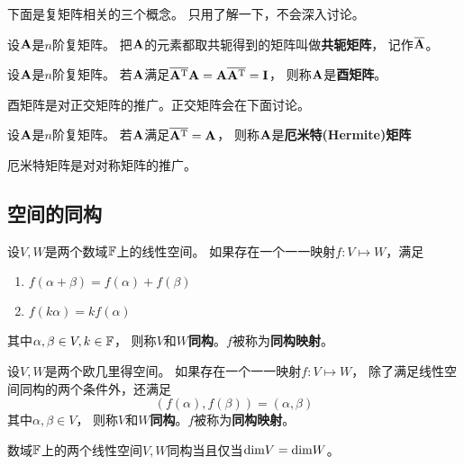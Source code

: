 下面是复矩阵相关的三个概念。
只用了解一下，不会深入讨论。

\begin{definition}[共轭矩阵]
  设$\mathbf{A}$是$n$阶复矩阵。
  把$\mathbf{A}$的元素都取共轭得到的矩阵叫做\textbf{共轭矩阵}，
  记作$\overline{\mathbf{A}}$。
\end{definition}

\begin{definition}[酉矩阵]
  设$\mathbf{A}$是$n$阶复矩阵。
  若$\mathbf{A}$满足$\overline{\mathbf{A}^{\textrm{T}}}\mathbf{A}=\mathbf{A}\overline{\mathbf{A}^{\textrm{T}}}=\mathbf{I}$，
  则称$\mathbf{A}$是\textbf{酉矩阵}。
\end{definition}

\begin{remark}
  酉矩阵是对正交矩阵的推广。正交矩阵会在下面讨论。
\end{remark}

\begin{definition}
  设$\mathbf{A}$是$n$阶复矩阵。
  若$\mathbf{A}$满足$\overline{\mathbf{A}^{\textrm{T}}}=\mathbf{A}$，
  则称$\mathbf{A}$是\textbf{厄米特(Hermite)矩阵}
\end{definition}

\begin{remark}
  厄米特矩阵是对对称矩阵的推广。
\end{remark}

\subsection{空间的同构}
\begin{definition}[线性空间的同构]
  设$V,W$是两个数域$\mathbb{F}$上的线性空间。
  如果存在一个一一映射$f:V\mapsto W$，满足
  \begin{enumerate}
    \item
    $f(\alpha+\beta)=f(\alpha)+f(\beta)$
    \item
    $f(k\alpha)=kf(\alpha)$
  \end{enumerate}
  其中$\alpha,\beta\in V,k\in\mathbb{F}$，
  则称$V$和$W$\textbf{同构}。$f$被称为\textbf{同构映射}。
\end{definition}

\begin{definition}[欧几里得空间的同构]
  设$V,W$是两个欧几里得空间。
  如果存在一个一一映射$f:V\mapsto W$，
  除了满足线性空间同构的两个条件外，还满足
  \[ (f(\alpha), f(\beta)) = (\alpha, \beta) \]
  其中$\alpha,\beta\in V$，
  则称$V$和$W$\textbf{同构}。$f$被称为\textbf{同构映射}。
\end{definition}

\begin{theorem}[线性空间同构的充要条件]
  数域$\mathbb{F}$上的两个线性空间$V,W$同构当且仅当$\textrm{dim} V = \textrm{dim} W$。
\end{theorem}

